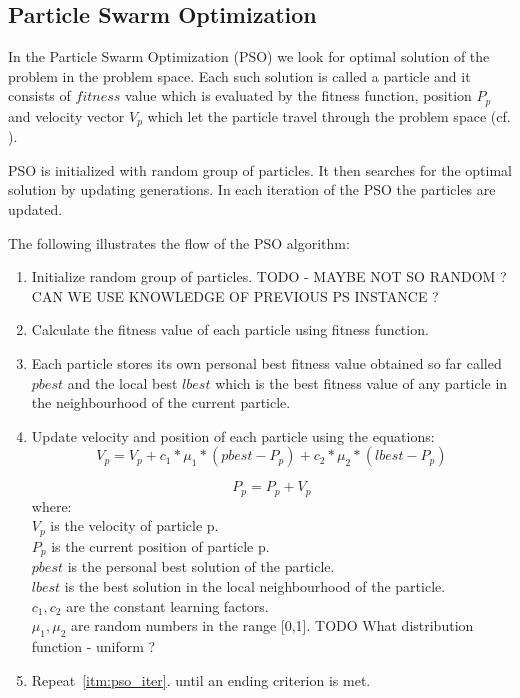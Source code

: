 \documentclass[runningheads,a4paper]{llncs}
\begin{document}
\subsection{Particle Swarm Optimization}
In the Particle Swarm Optimization (PSO) we look for optimal solution of the problem in the problem space. Each such solution is called a particle and it consists of $fitness$ value which is evaluated by the fitness function, position $P_p$ and velocity vector $V_p$ which let the particle travel through the problem space (cf. \cite{pso_origin}).

PSO is initialized with random group of particles. It then searches for the optimal solution by updating generations.
In each iteration of the PSO the particles are updated.

The following illustrates the flow of the PSO algorithm:



\begin{enumerate}
	\item Initialize random group of particles. {\color{red} TODO - MAYBE NOT SO RANDOM ? CAN WE USE KNOWLEDGE OF PREVIOUS PS INSTANCE ?}
	\item \label{itm:pso_iter} Calculate the fitness value of each particle using fitness function.
		
	\item Each particle stores its own personal best fitness value obtained so far called $pbest$ and the local best $lbest$ which is the best fitness value of any particle in the neighbourhood of the current particle.
	
	
	\item Update velocity and position of each particle using the equations:
	\begin{equation}
		V_p = V_p + c_1 * \mu_1 *(pbest - P_p) + c_2 * \mu_2 *(lbest - P_p)
	\end{equation}
	
	\begin{equation}
		P_p = P_p + V_p
	\end{equation}
	where:\\
	$V_p$ is the velocity of particle p.\\
	$P_p$ is the current position of particle p.\\
	$pbest$ 	is the personal best solution of the particle.\\
	$lbest$ 	is the best solution in the local neighbourhood of the particle.\\
	$c_1, c_2$ are the constant learning factors.\\
	$\mu_1, \mu_2$ are random numbers in the range [0,1]. {\color{red} TODO What distribution function - uniform ?} \\

	\item Repeat~\ref{itm:pso_iter}. until an ending criterion is met.
	
\end{enumerate}
\end{document}
